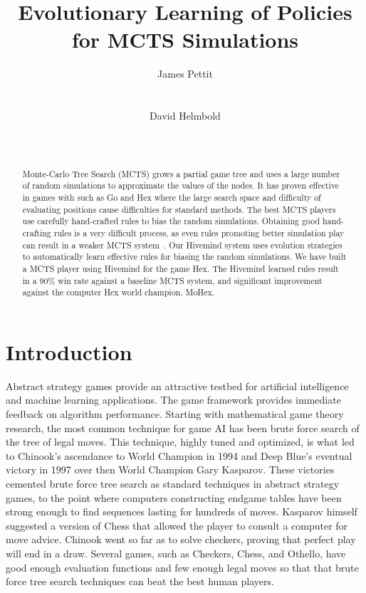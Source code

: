 \documentclass{acm_proc_article-sp}
\title{Evolutionary Learning of Policies for MCTS Simulations}
\author{ 
\alignauthor
James Pettit \\
       \affaddr{U.C. Santa Cruz}\\
       \affaddr{Santa Cruz, California}\\
       \email{ jpettit@soe.ucsc.edu}
\alignauthor
David Helmbold \\
       \affaddr{U.C. Santa Cruz}\\
       \affaddr{Santa Cruz, California}\\
       \email{dph@soe.ucsc.edu}
}
\begin{document}
\maketitle

\begin{abstract}
Monte-Carlo Tree Search (MCTS) 
grows a partial game tree and uses a large number of random simulations to
approximate the values of the nodes.   
It has proven effective in games with such as Go and Hex where the large search space and
difficulty of evaluating positions cause difficulties for standard methods.
The best MCTS players use carefully hand-crafted rules to bias the random simulations.
Obtaining good  hand-crafting rules is a very difficult process, as even rules promoting better
simulation play can result in a weaker MCTS system~\cite{gelly2006modification}.
Our Hivemind system uses evolution strategies to automatically learn effective rules for biasing the 
random simulations.
We have built a MCTS player using Hivemind for the game Hex. 
The Hivemind learned rules result in a 90\% win rate against a baseline MCTS system, and 
significant improvement against the computer Hex world champion, MoHex.
\end{abstract}


\section{Introduction}
Abstract strategy games provide an attractive testbed for artificial intelligence and machine learning applications. The game framework provides immediate feedback on algorithm performance. 
Starting with mathematical game theory research, the most common technique for game AI has been brute force search of the tree of legal moves. 
This technique, highly tuned and optimized, is what led to Chinook's ascendance to World Champion in 1994 and Deep Blue's eventual victory in 1997 over then World Champion Gary Kasparov. These victories cemented brute force tree search as standard techniques in abstract strategy games, to the point where computers constructing endgame tables have been strong enough to find sequences lasting for hundreds of moves. Kasparov himself suggested a version of Chess that allowed the player to consult a computer for move advice. Chinook went so far as to solve checkers, proving that perfect play will end in a draw. 
Several games, such as  Checkers, Chess, and Othello, have good enough evaluation functions and few enough legal moves so that that brute force tree search techniques can beat the best human players.
\end{document}
